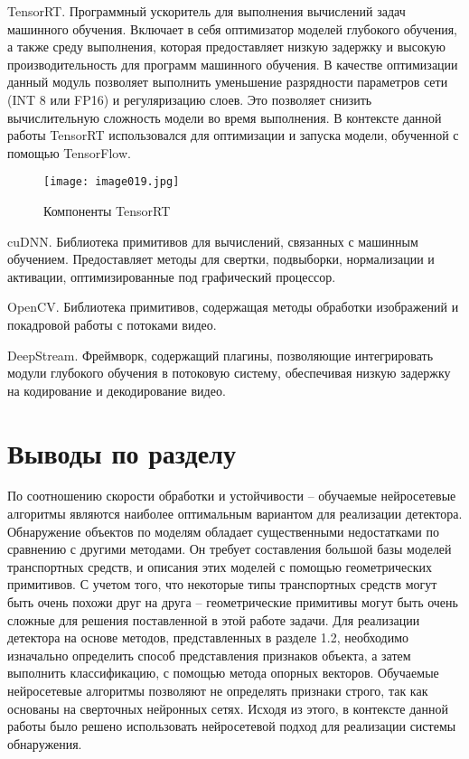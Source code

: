 %
\begin{itemize*}
  \item TensorRT.
	Программный ускоритель для выполнения вычислений задач машинного обучения. Включает в себя оптимизатор моделей глубокого обучения, а также среду выполнения, которая предоставляет низкую задержку и высокую производительность для программ машинного обучения.
	В качестве оптимизации данный модуль позволяет выполнить уменьшение разрядности параметров сети (INT 8 или FP16) и регуляризацию слоев. Это позволяет снизить вычислительную сложность модели во время выполнения. 
	В контексте данной работы TensorRT использовался для оптимизации и запуска модели, обученной с помощью TensorFlow.
	\begin{figure}[htbp]
	\centering
	\texttt{[image: image019.jpg]}
	\caption{Компоненты TensorRT}%
	\label{fig:how-to-do-research}
	\end{figure}
  \item cuDNN.
	Библиотека примитивов для вычислений, связанных с машинным обучением. Предоставляет методы для свертки, подвыборки, нормализации и активации, оптимизированные под графический процессор.
  \item OpenCV.
	Библиотека примитивов, содержащая методы обработки изображений и покадровой работы с потоками видео.	
  \item DeepStream.
	Фреймворк, содержащий плагины, позволяющие интегрировать модули глубокого обучения в потоковую систему, обеспечивая низкую задержку на кодирование и декодирование видео.
\end{itemize*}
%

\section{Выводы по разделу}

По соотношению скорости обработки и устойчивости – обучаемые нейросетевые алгоритмы являются наиболее оптимальным вариантом для реализации детектора. Обнаружение объектов по моделям обладает существенными недостатками по сравнению с другими методами. Он требует составления большой базы моделей транспортных средств, и описания этих моделей с помощью геометрических примитивов. С учетом того, что некоторые типы транспортных средств могут быть очень похожи друг на друга – геометрические примитивы могут быть очень сложные для решения поставленной в этой работе задачи. Для реализации детектора на основе методов, представленных в разделе 1.2, необходимо изначально определить способ представления признаков объекта, а затем выполнить классификацию, с помощью метода опорных векторов. Обучаемые нейросетевые алгоритмы позволяют не определять признаки строго, так как основаны на сверточных нейронных сетях. Исходя из этого, в контексте данной работы было решено использовать нейросетевой подход для реализации системы обнаружения.


